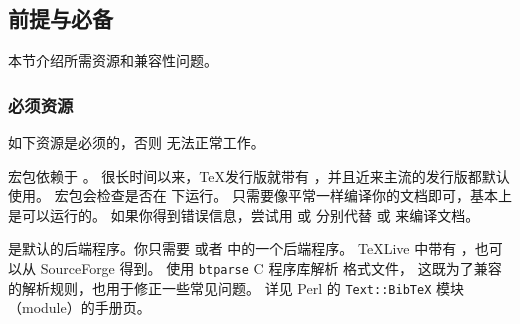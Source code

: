\subsection{前提与必备}
\label{int:pre}

本节介绍所需资源和兼容性问题。

\subsubsection{必须资源}
\label{int:pre:req}


如下资源是必须的，否则 \biblatex 无法正常工作。

\begin{marglist}

\item[\etex]
\biblatex 宏包依赖于 \eTeX 。
很长时间以来，\TeX 发行版就带有 \eTeX ，并且近来主流的发行版都默认使用。
\biblatex 宏包会检查是否在 \eTeX 下运行。
只需要像平常一样编译你的文档即可，基本上是可以运行的。
如果你得到错误信息，尝试用  或  分别代替  或  来编译文档。

\item[\biber]
\biber 是\biblatex 默认的后端程序。你只需要 \bibtex 或者 \biber 中的一个后端程序。
\TeX Live 中带有 \biber ，也可以从 SourceForge 得到。
\biber 使用 \texttt{btparse} C 程序库解析 \bibtex 格式文件，
这既为了兼容 \bibtex 的解析规则，也用于修正一些常见问题。
详见 Perl 的 \texttt{Text::BibTeX} 模块（module）的手册页。


\end{marglist}
